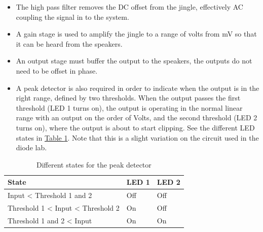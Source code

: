 \begin{itemize}
	\item The high pass filter removes the DC offset from the jingle, effectively AC coupling the signal in to the system.
	\item A gain stage is used to amplify the jingle to a range of volts from mV so that it can be heard from the speakers.
	\item An output stage must buffer the output to the speakers, the outputs do not need to be offset in phase.
	\item A peak detector is also required in order to indicate when the output is in the right range, defined by two thresholds. When the output passes the first threshold (LED 1 turns on), the output is operating in the normal linear range with an output on the order of Volts, and the second threshold (LED 2 turns on), where the output is about to start clipping. See the different LED states in \hyperref[tbl:10peakStates]{Table \ref*{tbl:10peakStates}}. Note that this is a slight variation on the circuit used in the diode lab. 
\end{itemize}


\begin{table}
	\centering
\begin{tabular}{| l | l | l |}
	\hline
	\textbf{State} & \textbf{LED 1} & \textbf{LED 2} \\ \hline
	Input < Threshold 1 and 2 & Off & Off \\ \hline
	Threshold 1 < Input < Threshold 2 & On & Off \\ \hline
	Threshold 1 and 2 < Input & On & On \\ \hline
\end{tabular}
	\caption{Different states for the peak detector}
	\label{tbl:10peakStates}
\end{table}

